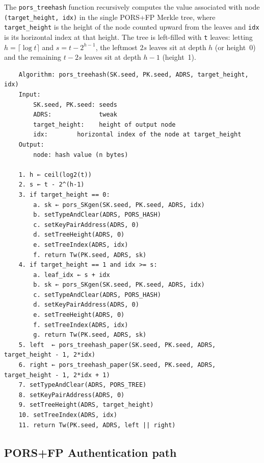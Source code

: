 The \texttt{pors\_treehash} function recursively computes the value associated with
node \texttt{(target\_height, idx)} in the single PORS+FP Merkle tree, where
\texttt{target\_height} is the height of the node counted upward from the leaves and \texttt{idx}
is its horizontal index at that height. The tree is left-filled with \texttt{t} leaves: letting $h = \lceil \log t \rceil$ and $s = t - 2^{h-1}$, the
leftmost $2s$ leaves sit at depth $h$ (or height~0) and the
remaining $t - 2s$ leaves sit at depth $h - 1$ (height~1).

\begin{verbatim}
    Algorithm: pors_treehash(SK.seed, PK.seed, ADRS, target_height, idx)
    Input:
        SK.seed, PK.seed: seeds
        ADRS:             tweak
        target_height:    height of output node
        idx:        horizontal index of the node at target_height
    Output:
        node: hash value (n bytes)

    1. h ← ceil(log2(t))
    2. s ← t - 2^(h-1)
    3. if target_height == 0:
        a. sk ← pors_SKgen(SK.seed, PK.seed, ADRS, idx)
        b. setTypeAndClear(ADRS, PORS_HASH)
        c. setKeyPairAddress(ADRS, 0)
        d. setTreeHeight(ADRS, 0)
        e. setTreeIndex(ADRS, idx)
        f. return Tw(PK.seed, ADRS, sk)
    4. if target_height == 1 and idx >= s:
        a. leaf_idx ← s + idx
        b. sk ← pors_SKgen(SK.seed, PK.seed, ADRS, idx)
        c. setTypeAndClear(ADRS, PORS_HASH)
        d. setKeyPairAddress(ADRS, 0)
        e. setTreeHeight(ADRS, 0)
        f. setTreeIndex(ADRS, idx)
        g. return Tw(PK.seed, ADRS, sk)
    5. left  ← pors_treehash_paper(SK.seed, PK.seed, ADRS, target_height - 1, 2*idx)
    6. right ← pors_treehash_paper(SK.seed, PK.seed, ADRS, target_height - 1, 2*idx + 1)
    7. setTypeAndClear(ADRS, PORS_TREE)
    8. setKeyPairAddress(ADRS, 0)
    9. setTreeHeight(ADRS, target_height)
    10. setTreeIndex(ADRS, idx)
    11. return Tw(PK.seed, ADRS, left || right)
\end{verbatim}

\subsection{PORS+FP Authentication path}

